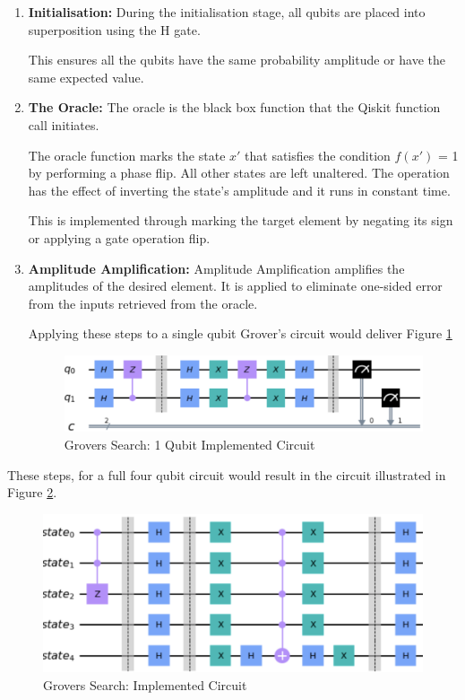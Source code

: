 \begin{enumerate}
    \item \textbf{Initialisation:} During the initialisation stage, all qubits are placed into superposition using the H gate.
    
    This ensures all the qubits have the same probability amplitude or have the same expected value.
   
    
    \item \textbf{The Oracle:} The oracle is the black box function that the Qiskit function call initiates. 
    
    The oracle function marks the state $x'$ that satisfies the condition $f(x')$ = 1 by performing a phase flip. All other states are left unaltered. The operation has the effect of inverting the state’s amplitude and it runs in constant time.
    
    This is implemented through marking the target element by negating its sign or applying a gate operation flip.
    
    \item \textbf{Amplitude Amplification:} Amplitude Amplification amplifies the amplitudes of the desired element. It is applied to eliminate one-sided error from the inputs  retrieved from the oracle.

Applying these steps to a single qubit Grover's circuit would deliver Figure \ref{GrovCirImple1QBit}
\begin{figure}[H]
      \centering
      \includegraphics[scale=0.5]{background/Grovers1Bit.png}
      \caption{Grovers Search: 1 Qubit Implemented Circuit}
      \label{GrovCirImple1QBit}
\end{figure}

\end{enumerate}

These steps, for a full four qubit circuit would result in the circuit %
 illustrated in Figure \ref{GrovCirImple}.
\begin{figure}[H]
      \centering
      \includegraphics[scale=0.5]{background/Grover_non_or.png}
      \caption{Grovers Search: Implemented Circuit}
      \label{GrovCirImple}
\end{figure}

